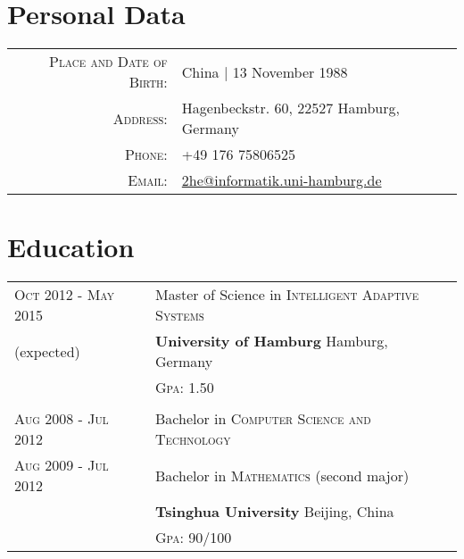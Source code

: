 \documentclass[a4paper,11pt]{article} %
\begin{document}

\par{\bigskip\par} %

\section{Personal Data}

\begin{tabular}{rl}
\textsc{Place and Date of Birth:} & China | 13 November 1988 \\
\textsc{Address:} & Hagenbeckstr. 60, 22527 Hamburg, Germany \\
\textsc{Phone:} & +49 176 75806525\\
\textsc{Email:} & \href{mailto:2he@informatik.uni-hamburg.de}{2he@informatik.uni-hamburg.de}
\end{tabular}


\section{Education}
\begin{tabular}{R{3.5cm}|p{11cm}}	
  \textsc{Oct 2012 - May 2015} & Master of Science in \textsc{Intelligent Adaptive Systems} \\
  {\footnotesize (expected)} & \textbf{University of Hamburg} \hfill Hamburg, Germany \\
  & \textsc{Gpa}: 1.50 \\
   \\


  \textsc{Aug 2008 - Jul 2012} & Bachelor in \textsc{Computer Science and Technology} \\
  \textsc{Aug 2009 - Jul 2012} & Bachelor in \textsc{Mathematics} (second major) \\
  & \textbf{Tsinghua University} \hfill Beijing, China \\
  & \textsc{Gpa}: 90/100 \\

\end{tabular}
\end{document}

